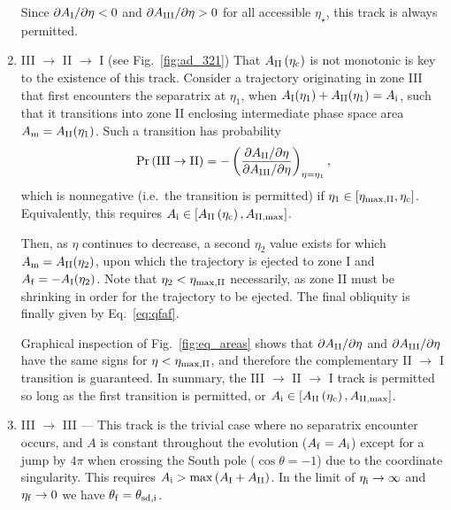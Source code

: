 \documentclass[
        fleqn,
        usenatbib,
    ]{mnras}
\newcommand*{\pdil}[2]{\partial#1 / \partial#2}
\newcommand*{\p}[1]{\left(#1\right)}
\newcommand*{\s}[1]{\left[#1\right]}
\begin{document}
\begin{enumerate}
        Since $\pdil{A_{\rm I}}{\eta} < 0$ and $\pdil{A_{\rm III}}{\eta} > 0$
        for all accessible $\eta_{\star}$, this track is always permitted.

    \item III $\to$ II $\to$ I (see Fig.~\ref{fig:ad_321}) That $A_{\rm II}
        \p{\eta_{\rm c}}$ is not monotonic is key to the existence of this track.
        Consider a trajectory originating in zone III that first encounters the
        separatrix at $\eta_1$, when $A_{\rm I}(\eta_1) + A_{\rm II}(\eta_1) =
        A_{\rm i}$, such that it transitions into zone II enclosing
        intermediate phase space area $A_{\rm m} = A_{\rm II}(\eta_1)$. Such a
        transition has probability
        \begin{equation}
            \Pr\p{\rm III \to II} = -\p{
                \frac{\pdil{A_{\rm II}}{\eta}}{\pdil{A_{\rm III}}{\eta}}}
                    _{\eta = \eta_1},
        \end{equation}
        which is nonnegative (i.e.\ the transition is permitted) if $\eta_1
        \in [\eta_{\rm \max, II}, \eta_{\rm c}]$. Equivalently, this requires
        $A_{\rm i} \in \s{A_{\rm II}\p{\eta_{\rm c}} , A_{\rm II, \max}}$.

        Then, as $\eta$ continues to decrease, a second $\eta_2$ value exists
        for which $A_{\rm m} = A_{\rm II}(\eta_2)$, upon which the trajectory
        is ejected to zone I and $A_{\rm f} = -A_{\rm I}(\eta_2)$. Note that
        $\eta_2 < \eta_{\rm \max, II}$ necessarily, as zone II must be shrinking
        in order for the trajectory to be ejected. The final obliquity is
        finally given by Eq.~\eqref{eq:qfaf}.

        Graphical inspection of Fig.~\ref{fig:eq_areas} shows that
        $\pdil{A_{\rm II}}{\eta}$ and $\pdil{A_{\rm III}}{\eta}$ have the same
        signs for $\eta < \eta_{\rm \max, II}$, and therefore the complementary
        II $\to$ I transition is guaranteed. In summary, the III $\to$ II $\to$
        I track is permitted so long as the first transition is permitted, or
        $A_{\rm i} \in \s{A_{\rm II}\p{\eta_{\rm c}} , A_{\rm II, \max}}$.

    \item III $\to$ III --- This track is the trivial case where no separatrix
        encounter occurs, and $A$ is constant throughout the evolution ($A_{\rm
        f} = A_{\rm i}$) except for a jump by $4\pi$ when crossing the South
        pole ($\cos \theta = -1$) due to the coordinate singularity. This
        requires $A_{\rm i} > \max \p{A_{\rm I} + A_{\rm II}}$. In the limit of
        $\eta_{\rm i} \to \infty$ and $ \eta_{\rm f} \to 0$ we have $\theta_{\rm
        f} = \theta_{\rm sd, i}$.


\end{enumerate}
\end{document}
